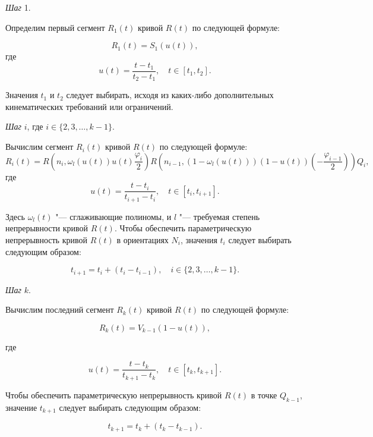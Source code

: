 \bigskip
\textit{Шаг} 1.

Определим первый сегмент $R_1(t)$ кривой $R(t)$ по следующей формуле:

$$
R_1(t)=S_1(u(t)),
$$
\noindent где
$$
u(t)=\frac{t-t_1}{t_2-t_1}, \quad t \in [t_1,t_2].
$$

Значения $t_1$ и $t_2$ следует выбирать, исходя из каких-либо дополнительных кинематических требований или ограничений.

\bigskip
\textit{Шаг} $i$, где $i \in \{2,3,\dots,k-1\}$.

Вычислим сегмент $R_i(t)$ кривой $R(t)$ по следующей формуле:
$$
R_i(t)=R(n_i,\omega_l(u(t))u(t)\frac{\varphi_i}{2})R(n_{i-1},(1-\omega_l(u(t)))(1-u(t))(-\frac{\varphi_{i-1}}{2}))Q_i,
$$
\noindent где
$$
u(t)=\frac{t-t_i}{t_{i+1}-t_i}, \quad t \in [t_i,t_{i+1}].
$$

Здесь $\omega_l(t)$ "--- сглаживающие полиномы, и $l$ "--- требуемая степень непрерывности кривой $R(t)$. Чтобы обеспечить
параметрическую непрерывность кривой $R(t)$ в ориентациях $N_i$, значения $t_i$ следует выбирать следующим образом:

$$
t_{i+1}=t_i+(t_i-t_{i-1}), \quad i \in \{2,3,\dots,k-1\}.
$$

\bigskip
\textit{Шаг} $k$.

Вычислим последний сегмент $R_k(t)$ кривой $R(t)$ по следующей формуле:

$$
R_k(t)=V_{k-1}(1-u(t)),
$$

\noindent где

$$
u(t)=\frac{t-t_k}{t_{k+1}-t_k}, \quad t \in [t_k,t_{k+1}].
$$

Чтобы обеспечить параметрическую непрерывность кривой $R(t)$ в точке $Q_{k-1}$, значение $t_{k+1}$ следует выбирать
следующим образом:

$$
t_{k+1}=t_k+(t_k-t_{k-1}).
$$
